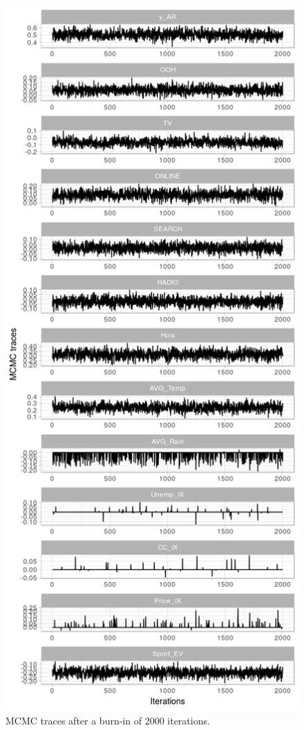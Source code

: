 \begin{figure}[h]
\centering
\includegraphics[scale=0.6]{figures/traces.png}
\caption{MCMC traces after a burn-in of 2000 iterations.}\label{fig:traces}
\end{figure}

